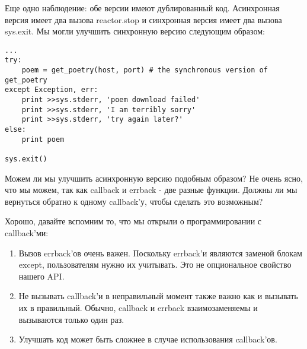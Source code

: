 Еще одно наблюдение: обе версии имеют дублированный код. 
Асинхронная версия имеет два вызова reactor.stop и 
синхронная версия имеет два вызова sys.exit. Мы могли 
улучшить синхронную версию следующим образом:

 \begin{verbatim}
...
try:
    poem = get_poetry(host, port) # the synchronous version of get_poetry
except Exception, err:
    print >>sys.stderr, 'poem download failed'
    print >>sys.stderr, 'I am terribly sorry'
    print >>sys.stderr, 'try again later?'
else:
    print poem

sys.exit()
\end{verbatim} 


Можем ли мы улучшить асинхронную версию подобным образом? 
Не очень ясно, что мы можем, так как callback и errback - 
две разные функции. Должны ли мы вернуться обратно к 
одному callback'у, чтобы сделать это возможным?


Хорошо, давайте вспомним то, что мы открыли о программировании 
с callback'ми:

\begin{enumerate}
\item Вызов errback'ов очень важен. Поскольку errback'и являются 
заменой блокам except, пользователям нужно их учитывать. Это не 
опциональное свойство нашего API.

\item Не вызывать callback'и в неправильный момент также 
важно как и вызывать их в правильный. Обычно, callback и errback взаимозаменяемы и 
вызываются только один раз.

\item Улучшать код может быть сложнее в случае использования callback'ов.
\end{enumerate}


